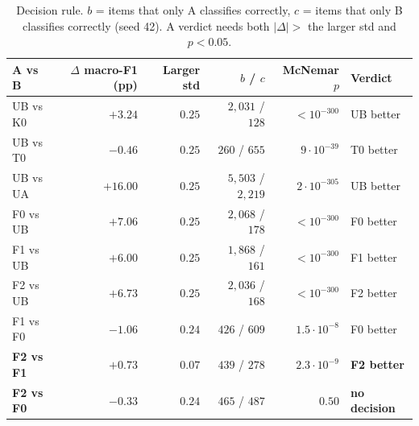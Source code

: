 \begin{table}[H]
  \centering\small
  \caption{Decision rule. $b$ = items that only A classifies correctly, $c$ = items that only B classifies
  correctly (seed 42). A verdict needs both $|\Delta| >$ the larger std and $p<0.05$.}
  \label{tab:decision}
  \begin{tabular}{@{}lrrrrl@{}}
    \toprule
    A vs B & $\Delta$ macro-F1 (pp) & Larger std & $b$ / $c$ & McNemar $p$ & Verdict \\
    \midrule
    UB vs K0 & $+3.24$  & $0.25$ & $2{,}031$ / $128$     & $<10^{-300}$ & UB better \\
    UB vs T0 & $-0.46$  & $0.25$ & $260$ / $655$         & $9\cdot10^{-39}$ & T0 better \\
    UB vs UA & $+16.00$ & $0.25$ & $5{,}503$ / $2{,}219$ & $2\cdot10^{-305}$ & UB better \\
    F0 vs UB & $+7.06$  & $0.25$ & $2{,}068$ / $178$     & $<10^{-300}$ & F0 better \\
    F1 vs UB & $+6.00$  & $0.25$ & $1{,}868$ / $161$     & $<10^{-300}$ & F1 better \\
    F2 vs UB & $+6.73$  & $0.25$ & $2{,}036$ / $168$     & $<10^{-300}$ & F2 better \\
    F1 vs F0 & $-1.06$  & $0.24$ & $426$ / $609$         & $1.5\cdot10^{-8}$ & F0 better \\
    \textbf{F2 vs F1} & $+0.73$ & $0.07$ & $439$ / $278$ & $2.3\cdot10^{-9}$ & \textbf{F2 better} \\
    \textbf{F2 vs F0} & $-0.33$ & $0.24$ & $465$ / $487$ & $0.50$ & \textbf{no decision} \\
    \bottomrule
  \end{tabular}
\end{table}

